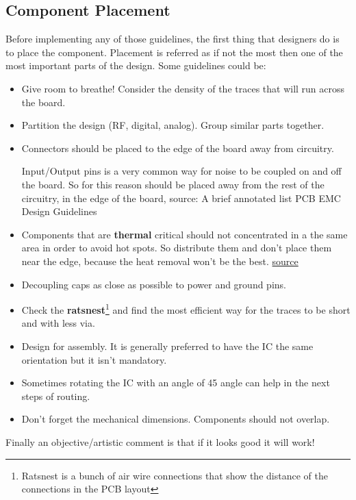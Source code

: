 \documentclass[12pt]{article}
\begin{document}
\subsection{Component Placement}

Before implementing any of those guidelines, the first thing that designers do is to place the component. Placement is referred as if not the most then one of the most important parts of the design. Some guidelines could be:

\begin{itemize}
	\item Give room to breathe! Consider the density of the traces that will run across the board.
	\item Partition the design (RF, digital, analog). Group similar parts together.
	\item Connectors should be placed to the edge of the board away from circuitry.
	
Input/Output pins is a very common way for noise to be coupled on and off the board. So for this reason should be placed away from the rest of the circuitry, in the edge of the board, source: A brief annotated list PCB EMC Design Guidelines

	\item Components that are \textbf{thermal} critical should not concentrated in a the same area in order to avoid hot spots. So distribute them and don't place them near the edge, because the heat removal won't be the best. \href{https://www.allaboutcircuits.com/technical-articles/pcb-thermal-management-techniques/}{source}
	
	\item Decoupling caps as close as possible to power and ground pins.
	\item Check the \textbf{ratsnest}\footnote{Ratsnest is a bunch of air wire connections that show the distance of the connections in the PCB layout} and find the most efficient way for the traces to be short and with less via.
	\item Design for assembly. It is generally preferred to have the IC the same orientation but it isn't mandatory.
	\item Sometimes rotating the IC with an angle of 45 angle can help in the next steps of routing.
	\item Don't forget the mechanical dimensions. Components should not overlap.
\end{itemize}

Finally an objective/artistic comment is that if it looks good it will work!
\end{document}
